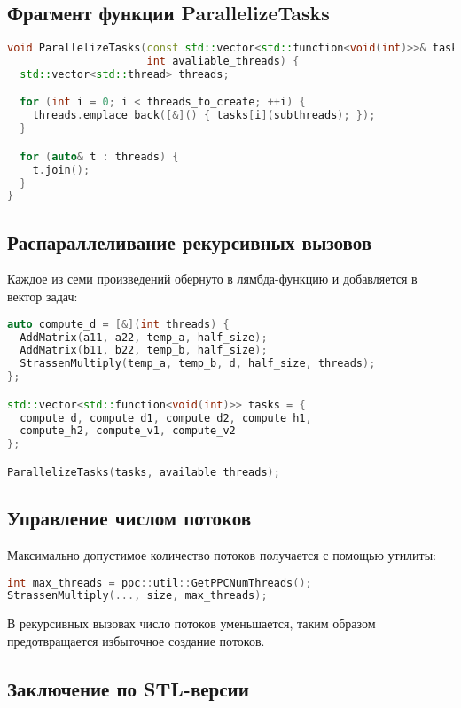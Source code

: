 \documentclass[14pt,a4paper]{extarticle}
\begin{document}
\subsection*{Фрагмент функции ParallelizeTasks}

\begin{lstlisting}[language=C++]
void ParallelizeTasks(const std::vector<std::function<void(int)>>& tasks,
                      int avaliable_threads) {
  std::vector<std::thread> threads;

  for (int i = 0; i < threads_to_create; ++i) {
    threads.emplace_back([&]() { tasks[i](subthreads); });
  }

  for (auto& t : threads) {
    t.join();
  }
}
\end{lstlisting}

\subsection*{Распараллеливание рекурсивных вызовов}

Каждое из семи произведений обернуто в лямбда-функцию и добавляется в вектор задач:

\begin{lstlisting}[language=C++]
auto compute_d = [&](int threads) {
  AddMatrix(a11, a22, temp_a, half_size);
  AddMatrix(b11, b22, temp_b, half_size);
  StrassenMultiply(temp_a, temp_b, d, half_size, threads);
};

std::vector<std::function<void(int)>> tasks = {
  compute_d, compute_d1, compute_d2, compute_h1,
  compute_h2, compute_v1, compute_v2
};

ParallelizeTasks(tasks, available_threads);
\end{lstlisting}

\subsection*{Управление числом потоков}

Максимально допустимое количество потоков получается с помощью утилиты:

\begin{lstlisting}[language=C++]
int max_threads = ppc::util::GetPPCNumThreads();
StrassenMultiply(..., size, max_threads);
\end{lstlisting}

В рекурсивных вызовах число потоков уменьшается, таким образом предотвращается избыточное создание потоков.

\subsection*{Заключение по STL-версии}
\end{document}
